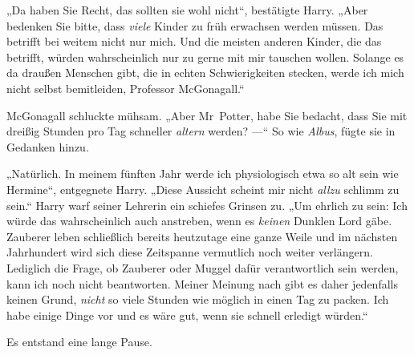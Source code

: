 „Da haben Sie Recht, das sollten sie wohl nicht“, bestätigte Harry.
„Aber bedenken Sie bitte, dass \emph{viele} Kinder zu früh erwachsen werden müssen. Das betrifft bei weitem nicht nur mich. Und die meisten anderen Kinder, die das betrifft, würden wahrscheinlich nur zu gerne mit mir tauschen wollen. Solange es da draußen Menschen gibt, die in echten Schwierigkeiten stecken, werde ich mich nicht selbst bemitleiden, Professor McGonagall.“

McGonagall schluckte mühsam.
„Aber Mr~Potter, habe Sie bedacht, dass Sie mit dreißig Stunden pro Tag schneller \emph{altern} werden? —“ So wie \emph{Albus}, fügte sie in Gedanken hinzu.

„Natürlich. In meinem fünften Jahr werde ich physiologisch etwa so alt sein wie Hermine“, entgegnete Harry.
„Diese Aussicht scheint mir nicht \emph{allzu} schlimm zu sein.“ Harry warf seiner Lehrerin ein schiefes Grinsen zu.
„Um ehrlich zu sein: Ich würde das wahrscheinlich auch anstreben, wenn es \emph{keinen} Dunklen Lord gäbe. Zauberer leben schließlich bereits heutzutage eine ganze Weile und im nächsten Jahrhundert wird sich diese Zeitspanne vermutlich noch weiter verlängern. Lediglich die Frage, ob Zauberer oder Muggel dafür verantwortlich sein werden, kann ich noch nicht beantworten. Meiner Meinung nach gibt es daher jedenfalls keinen Grund, \emph{nicht} so viele Stunden wie möglich in einen Tag zu packen. Ich habe einige Dinge vor und es wäre gut, wenn sie schnell erledigt würden.“

Es entstand eine lange Pause.

